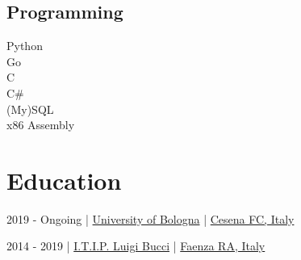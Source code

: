 \documentclass{article}
\begin{document}
\begin{paracol}{2}
\begin{tcolorbox}[colback=white]
    \subsection*{Programming}
     Python \\[4pt]
     Go \\[4pt]
     C \\[4pt]
     C\# \\[4pt]
     (My)SQL \\[4pt]
     x86 Assembly \\[80pt]

    \vspace{30pt}
\end{tcolorbox}

\switchcolumn

\maketitle

%
%

\vfill

\center

\section*{ Education}

\begin{tcolorbox}[
    title=\href{
        https://corsi.unibo.it/1cycle/ComputerScienceEngineering
    }{
        \emoji{open-book} Bachelor in Computer Science and Engineering
    },
    colback=white
]
     2019 - Ongoing \hfill | \hfill
    \href{https://www.unibo.it/en/}{ University of Bologna} \hfill | \hfill
    \href{https://www.openstreetmap.org/relation/9713588}{ Cesena FC, Italy}
\end{tcolorbox}

\begin{tcolorbox}[title=\emoji{closed-book} High School Diploma in Information Technology,colback=white]
     2014 - 2019 \hfill | \hfill
    \href{https://www.itipfaenza.edu.it/}{ I.T.I.P. Luigi Bucci} \hfill | \hfill
    \href{https://www.openstreetmap.org/relation/2227656}{ Faenza RA, Italy}
\end{tcolorbox}


\end{paracol}
\end{document}
